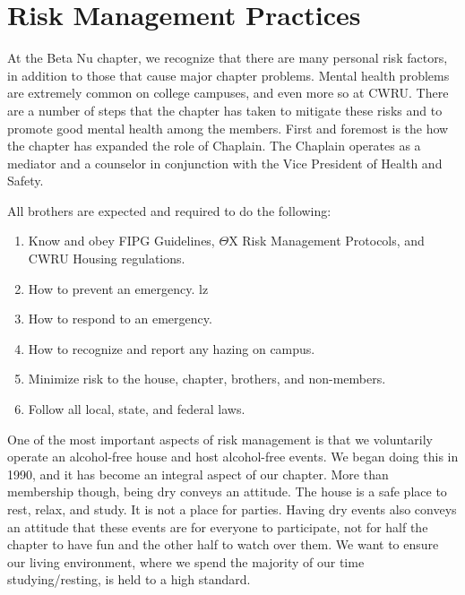 \chapter{Risk Management Practices}

  At the Beta Nu chapter, we recognize that there are many personal risk factors, in addition to those that cause major chapter problems. Mental health problems are extremely common on college campuses, and even more so at CWRU. There are a number of steps that the chapter has taken to mitigate these risks and to promote good mental health among the members. First and foremost is the how the chapter has expanded the role of Chaplain. The Chaplain operates as a mediator and a counselor in conjunction with the Vice President of Health and Safety. 
  
  All brothers are expected and required to do the following: 
  
  \begin{enumerate}
  	\item Know and obey FIPG Guidelines, $\Theta$X Risk Management Protocols, and CWRU Housing regulations. 
  	
  	\item How to prevent an emergency.
  	lz
  	\item How to respond to an emergency.
  	
  	\item How to recognize and report any hazing on campus.
  	
  	\item Minimize risk to the house, chapter, brothers, and non-members. 
  	
  	\item Follow all local, state, and federal laws.
  \end{enumerate}

  One of the most important aspects of risk management is that we voluntarily operate an alcohol-free house and host alcohol-free events. We began doing this in 1990, and it has become an integral aspect of our chapter. More than membership though, being dry conveys an attitude. The house is a safe place to rest, relax, and study. It is not a place for parties. Having dry events also conveys an attitude that these events are for everyone to participate, not for half the chapter to have fun and the other half to watch over them. We want to ensure our living environment, where we spend the majority of our time studying/resting, is held to a high standard. \\

